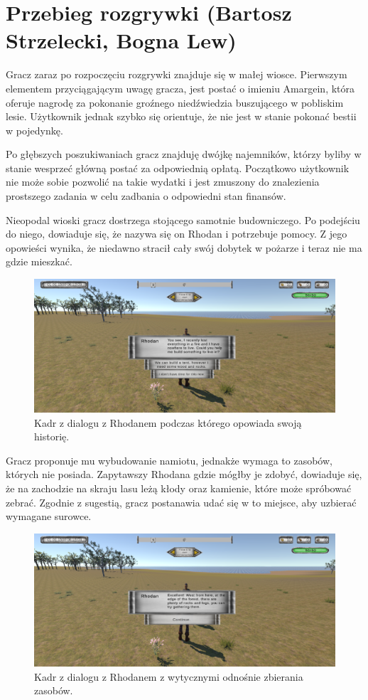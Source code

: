 \section{Przebieg rozgrywki (Bartosz Strzelecki, Bogna Lew)}
Gracz zaraz po rozpoczęciu rozgrywki znajduje się w małej wiosce. Pierwszym
elementem przyciągającym uwagę gracza, jest postać o imieniu Amargein, która oferuje
nagrodę za pokonanie groźnego niedźwiedzia buszującego w pobliskim lesie. Użytkownik jednak
szybko się orientuje, że nie jest w stanie pokonać bestii w pojedynkę.

Po głębszych poszukiwaniach gracz znajduję dwójkę najemników, którzy byliby w stanie
wesprzeć główną postać za odpowiednią opłatą. Początkowo użytkownik nie może sobie
pozwolić na takie wydatki i jest zmuszony do znalezienia prostszego zadania
w celu zadbania o odpowiedni stan finansów.

Nieopodal wioski gracz dostrzega stojącego samotnie budowniczego. Po podejściu do niego, dowiaduje się, że nazywa się on
Rhodan i potrzebuje pomocy. Z jego opowieści wynika, że niedawno stracił cały swój dobytek w
pożarze i teraz nie ma gdzie mieszkać.

\begin{figure}[h!]
    \centering
    \includegraphics[width=1\textwidth]{images/rozgrywka/rhodan3.png}
    \caption{Kadr z dialogu z Rhodanem podczas którego opowiada swoją historię.}
\end{figure}

Gracz proponuje mu wybudowanie namiotu, jednakże wymaga to zasobów, których nie posiada. Zapytawszy Rhodana gdzie mógłby
je zdobyć, dowiaduje się, że na zachodzie na skraju lasu leżą kłody oraz kamienie, które może spróbować zebrać. Zgodnie
z sugestią, gracz postanawia udać się w to miejsce, aby uzbierać wymagane surowce.

\begin{figure}[h!]
    \centering
    \includegraphics[width=1\textwidth]{images/rozgrywka/rhodan4.png}
    \caption{Kadr z dialogu z Rhodanem z wytycznymi odnośnie zbierania zasobów.}
\end{figure}

